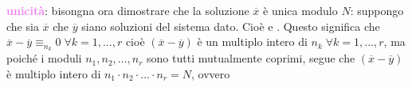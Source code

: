 \begin{flushleft}
\begin{boxA}
        \textcolor{violet}{\textbf{unicità}}: bisongna ora dimostrare che la soluzione $\overline{x}$ è unica modulo $N$: suppongo che sia $\overline{x}$ che $\overline{y}$ siano soluzioni del sistema dato. Cioè  e . Questo significa che $\overline{x} - \overline{y} \equiv_{n_k} 0 \; \forall k = 1, ..., r$ cioè $(\overline{x} - \overline{y})$ è un multiplo intero di $n_k \; \forall k = 1, ..., r$, ma poiché i moduli $n_1, n_2, ..., n_r$ sono tutti mutualmente coprimi, segue che $(\overline{x} - \overline{y})$ è multiplo intero di $n_1 \cdot n_2 \cdot ... \cdot n_r = N$, ovvero 
    \end{boxA}
\end{flushleft}